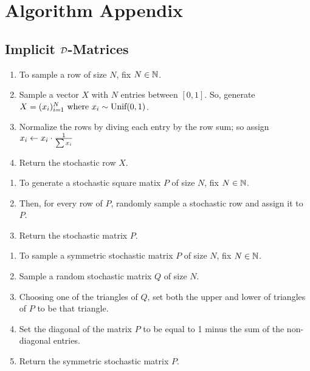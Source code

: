 
\chapter{Algorithm Appendix}

\section{Implicit $\mathcal{D}$-Matrices}

\begin{algorithm} \hfill
\begin{enumerate}
	\item To sample a row of size $N$, fix $N \in \mathbb{N}$.
	\item Sample a vector $X$ with $N$ entries between $[0,1]$. So, generate $X = (x_i)_{i = 1}^N \text{ where } x_i \sim \text{Unif}(0,1)$.
	\item Normalize the rows by diving each entry by the row sum; so assign $x_i \leftarrow x_i \cdot \frac{1}{\sum{x_i}}$
	\item Return the stochastic row $X$.
\end{enumerate}
\end{algorithm}

\begin{algorithm} \hfill
\begin{enumerate}
	\item To generate a stochastic square matix $P$ of size $N$, fix $N \in \mathbb{N}$.
	\item Then, for every row of $P$, randomly sample a stochastic row and assign it to $P$.
	\item Return the stochastic matrix $P$.
\end{enumerate}
\end{algorithm}

\begin{algorithm} \hfill
\begin{enumerate}
	\item To sample a symmetric stochastic matrix $P$ of size $N$, fix $N \in \mathbb{N}$.
	\item Sample a random stochastic matrix $Q$ of size $N$.
	\item Choosing one of the triangles of $Q$, set both the upper and lower of triangles of $P$ to be that triangle.
	\item Set the diagonal of the matrix $P$ to be equal to 1 minus the sum of the non-diagonal entries.
	\item Return the symmetric stochastic matrix $P$.
\end{enumerate}
\end{algorithm}

